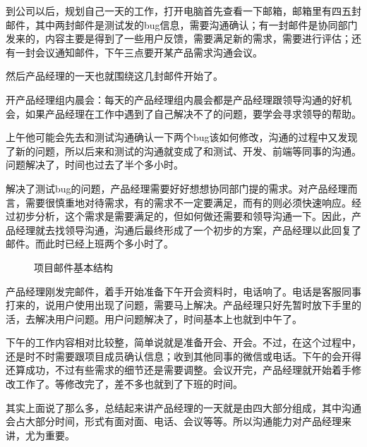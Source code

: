 \documentclass[letterpaper,10pt,english]{sphinxmanual}
\begin{document}
到公司以后，规划自己一天的工作，打开电脑首先查看一下邮箱，邮箱里有四五封邮件，其中两封邮件是测试发的bug信息，需要沟通确认；有一封邮件是协同部门发来的，内容主要是得到了一些用户反馈，需要满足新的需求，需要进行评估；还有一封会议通知邮件，下午三点要开某产品需求沟通会议。

然后产品经理的一天也就围绕这几封邮件开始了。

开产品经理组内晨会：每天的产品经理组内晨会都是产品经理跟领导沟通的好机会，如果产品经理在工作中遇到了自己解决不了的问题，要学会寻求领导的帮助。

上午他可能会先去和测试沟通确认一下两个bug该如何修改，沟通的过程中又发现了新的问题，所以后来和测试的沟通就变成了和测试、开发、前端等同事的沟通。问题解决了，时间也过去了半个多小时。

解决了测试bug的问题，产品经理需要好好想想协同部门提的需求。对产品经理而言，需要很慎重地对待需求，有的需求不一定要满足，而有的则必须快速响应。经过初步分析，这个需求是需要满足的，但如何做还需要和领导沟通一下。因此，产品经理就去找领导沟通，沟通后最终形成了一个初步的方案，产品经理以此回复了邮件。而此时已经上班两个多小时了。

\begin{figure}[H]
\centering
\capstart

\noindent{}
\caption{项目邮件基本结构\sphinxfootnotemark[347]}\label{\detokenize{chapter_introduction/1Day:id8}}\end{figure}
%
\begin{footnotetext}[347]\sphinxAtStartFootnote
{}
%
\end{footnotetext}\ignorespaces 
产品经理刚发完邮件，着手开始准备下午开会资料时，电话响了。电话是客服同事打来的，说用户使用出现了问题，需要马上解决。产品经理只好先暂时放下手里的活，去解决用户问题。用户问题解决了，时间基本上也就到中午了。

下午的工作内容相对比较整，简单说就是准备开会、开会。不过，在这个过程中，还是时不时需要跟项目成员确认信息；收到其他同事的微信或电话。下午的会开得还算成功，不过有些需求的细节还是需要调整。会议开完，产品经理就开始着手修改工作了。等修改完了，差不多也就到了下班的时间。

其实上面说了那么多，总结起来讲产品经理的一天就是由四大部分组成，其中沟通会占大部分时间，形式有面对面、电话、会议等等。所以沟通能力对产品经理来讲，尤为重要。
\end{document}
